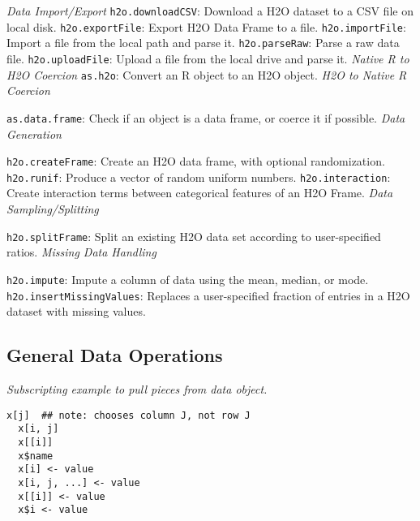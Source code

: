 {{\emph{Data Import/Export}}
{\texttt{h2o.downloadCSV}}: Download a H2O dataset to a CSV file on local disk.
{\texttt{h2o.exportFile}}: Export H2O Data Frame to a file.
{\texttt{h2o.importFile}}: Import a file from the local path and parse it. 
{\texttt{h2o.parseRaw}}: Parse a raw data file.  
{\texttt{h2o.uploadFile}}: Upload a file from the local drive and parse it. 
\medskip
{\emph{Native R to H2O Coercion}}\smallskip
 {\texttt{as.h2o}}: Convert an R object to an H2O object. 
\medskip
\emph{H2O to Native R Coercion}\par
{\texttt{as.data.frame}}: Check if an object is a data frame, or coerce it if possible. 
\medskip
\emph{Data Generation}\par
{\texttt{h2o.createFrame}}: Create an H2O data frame, with optional randomization. 
{\texttt{h2o.runif}}: Produce a vector of random uniform numbers. 
{\texttt{h2o.interaction}}: Create interaction terms between categorical features of an H2O Frame. 
\medskip
\emph{Data Sampling/Splitting}\par
{\texttt{h2o.splitFrame}: Split an existing H2O data set according to user-specified ratios. 
\newpage
\emph{Missing Data Handling}\par
{\texttt{h2o.impute}}: Impute a column of data using the mean, median, or mode. 
{\texttt{h2o.insertMissingValues}}: Replaces a user-specified fraction of entries in a H2O dataset with missing values. 

\subsection{General Data Operations}

\emph{Subscripting example to pull pieces from data object.} 
\begin{lstlisting}[style=R]
  x[j]  ## note: chooses column J, not row J
  x[i, j]
  x[[i]]
  x$name 
  x[i] <- value
  x[i, j, ...] <- value
  x[[i]] <- value
  x$i <- value
\end{lstlisting}

}}
